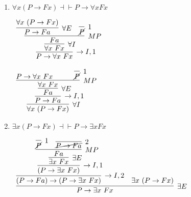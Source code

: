\documentclass[11pt]{report}
\begin{document}
\begin{enumerate}
\begin{enumerate}
			\item $\forall x (P \to Fx) \dashv \vdash  P \to \forall x Fx$
			
				\begin{mdframed}
					\begin{center}
						$\begin{array}{c}
							\infer[\to I,1]{P \to \forall x \ Fx}
								{\infer[\forall I]{\forall x \ Fx}
									{\infer[MP]{Fa}
										{\infer[\forall E]{P \to Fa}{\forall x \ (P \to Fx)}
										&
										\infer[1]{\cancel{P}}{}}}}
						\end{array}$
					\end{center}
				\end{mdframed}

				\begin{mdframed}
					\begin{center}
						$\begin{array}{c}
							\infer[\forall I]{\forall x \ (P \to Fx)}
								{\infer[\to I,1]{P \to Fa}
									{\infer[\forall E]{Fa}
										{\infer[MP]{\forall x \ Fx}
											{P \to \forall x \ Fx
											&
											\hspace{0.7cm} \infer[1]{\cancel{P}}{}}}}}
						\end{array}$
					\end{center}
				\end{mdframed}
			
			\newpage
			\item $\exists x (P \to Fx) \dashv \vdash  P \to \exists x Fx$
			
				\begin{mdframed}
					\begin{center}
						$\begin{array}{c}
							\infer[\exists E]{P \to \exists x \ Fx}
								{\infer[\to I,2]{(P \to Fa) \to (P \to \exists x \ Fx)}
									{\infer[\to I,1]{(P \to \exists x \ Fx)}
										{\infer[\exists E]{\exists x \ Fx}
											{\infer[MP]{Fa}
												{\infer[1]{\cancel{P}}{}
												&
												\infer[2]{\cancel{P \to Fa}}{}}}}}
								&
								\exists x \ (P \to Fx)}
						\end{array}$
					\end{center}
				\end{mdframed}




\end{enumerate}
\end{enumerate}
\end{document}
